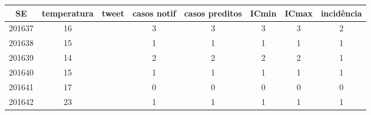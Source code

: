 \begin{tabular}{c|ccccccc}
  \hline
SE & temperatura & tweet & casos notif & casos preditos & ICmin & ICmax & incidência \\ 
  \hline
201637 & 16 &  & 3 & 3 & 3 & 3 & 2 \\ 
  201638 & 15 &  & 1 & 1 & 1 & 1 & 1 \\ 
  201639 & 14 &  & 2 & 2 & 2 & 2 & 1 \\ 
  201640 & 15 &  & 1 & 1 & 1 & 1 & 1 \\ 
  201641 & 17 &  & 0 & 0 & 0 & 0 & 0 \\ 
  201642 & 23 &  & 1 & 1 & 1 & 1 & 1 \\ 
   \hline
\end{tabular}
